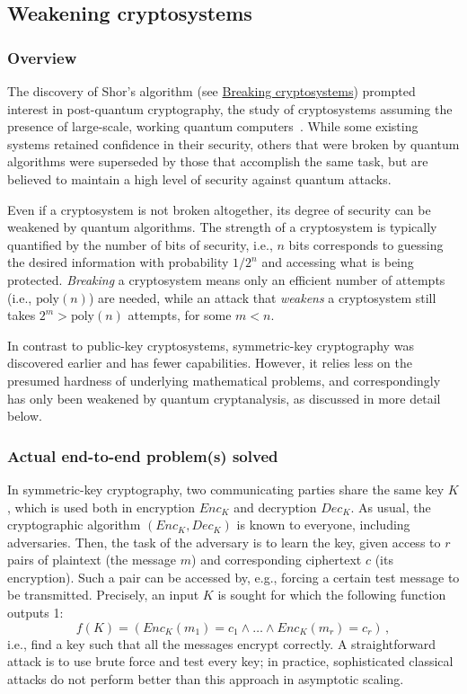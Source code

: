 \begin{refsection}
\subsection{Weakening cryptosystems} \label{appl:WeakeningCrypto}

\subsubsection*{Overview}
The discovery of Shor's algorithm (see \hyperref[appl:BreakingCrypto]{Breaking cryptosystems}) prompted interest in post-quantum cryptography, the study of cryptosystems assuming the presence of large-scale, working quantum computers~\cite{bernstein2017PostQuantumCrypto}. While some existing systems retained confidence in their security, others that were broken by quantum algorithms were superseded by those that accomplish the same task, but are believed to maintain a high level of security against quantum attacks. 

Even if a cryptosystem is not broken altogether, its degree of security can be weakened by quantum algorithms. The strength of a cryptosystem is typically quantified by the number of bits of security, i.e., $n$ bits corresponds to guessing the desired information with probability $1/2^n$ and accessing what is being protected. \textit{Breaking} a cryptosystem means only an efficient number of attempts (i.e., $\mathrm{poly}(n)$) are needed, while an attack that \textit{weakens} a cryptosystem still takes $2^m > \mathrm{poly}(n)$ attempts, for some $m<n$. 

In contrast to public-key cryptosystems, symmetric-key cryptography was discovered earlier and has fewer capabilities. However, it relies less on the presumed hardness of underlying mathematical problems, and correspondingly has only been weakened by quantum cryptanalysis, as discussed in more detail below.

\subsubsection*{Actual end-to-end problem(s) solved}

In symmetric-key cryptography, two communicating parties share the same key $K$, which is used both in encryption $\mathit{Enc}_K$ and decryption $\mathit{Dec}_K$. As usual, the cryptographic algorithm $(\mathit{Enc}_K,\mathit{Dec}_K)$ is known to everyone, including adversaries. Then, the task of the adversary is to learn the key, given access to $r$ pairs of plaintext (the message $m$) and corresponding ciphertext $c$ (its encryption). Such a pair can be accessed by, e.g., forcing a certain test message to be transmitted. Precisely, an input $K$ is sought for which the following function outputs 1:
\begin{equation}
    f(K) = (\mathit{Enc}_K(m_1)=c_1 \land \ldots \land \mathit{Enc}_K(m_r)=c_r) \,, 
\end{equation}
i.e., find a key such that all the messages encrypt correctly. A straightforward attack is to use brute force and test every key; in practice, sophisticated classical attacks do not perform better than this approach in asymptotic scaling. 



\end{refsection}
